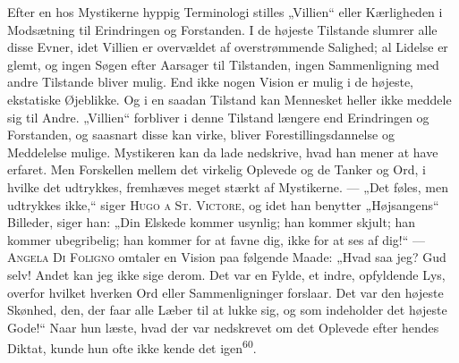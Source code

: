 \documentclass[12pt,a4paper,openany]{book}
\begin{document}
Efter en hos Mystikerne hyppig Terminologi stilles „Villien“ eller
Kærligheden i Modsætning til Erindringen og Forstanden. I de højeste
Tilstande slumrer alle disse Evner, idet Villien er overvældet af
overstrømmende Salighed; al Lidelse er glemt, og ingen Søgen efter
Aarsager til Tilstanden, ingen Sammenligning med andre Tilstande bliver
mulig. End ikke nogen Vision er mulig i de højeste, ekstatiske
Øjeblikke. Og i en saadan Tilstand kan Mennesket heller ikke meddele sig
til Andre. „Villien“ forbliver i denne Tilstand længere end Erindringen
og Forstanden, og saasnart disse kan virke, bliver Forestillingsdannelse
og Meddelelse mulige. Mystikeren kan da lade nedskrive, hvad han mener
at have erfaret. Men Forskellen mellem det virkelig Oplevede og de
Tanker og Ord, i hvilke det udtrykkes, fremhæves meget stærkt af
Mystikerne. --- „Det føles, men udtrykkes ikke,“ siger \textsc{Hugo a
St. Victore}, og idet han benytter „Højsangens“ Billeder, siger han:
„Din Elskede kommer usynlig; han kommer skjult; han kommer ubegribelig;
han kommer for at favne dig, ikke for at ses af dig!“ --- \textsc{Angela
Di Foligno} omtaler en Vision paa følgende Maade: „Hvad saa jeg? Gud
selv! Andet kan jeg ikke sige derom. Det var en Fylde, et indre,
opfyldende Lys, overfor hvilket hverken Ord eller Sammenligninger
forslaar. Det var den højeste Skønhed, den, der faar alle Læber til at
lukke sig, og som indeholder det højeste Gode!“ Naar hun læste, hvad der
var nedskrevet om det Oplevede efter hendes Diktat, kunde hun ofte ikke
kende det igen\textsuperscript{60}.
\end{document}
